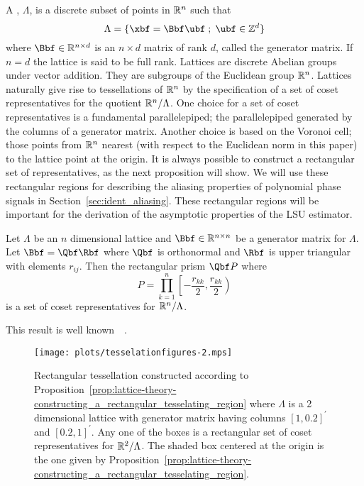 \documentclass[journal]{IEEEtran}
\begin{document}
A ,  $\Lambda$, is a discrete subset of points in ${\mathbb R}^n$ such that
\[
   \Lambda = \{\xbf = \Bbf\ubf \mid \ubf \in \ints^d \}
\]
where $\Bbf \in \reals^{n \times d}$ is an $n \times d$ matrix of rank $d$, called the generator matrix.  If $n = d$ the lattice is said to be full rank.  Lattices are discrete Abelian groups under vector addition.  They are subgroups of the Euclidean group ${\mathbb R}^n$.  Lattices naturally give rise to tessellations of ${\mathbb R}^n$ by the specification of a set of coset representatives for the quotient ${\mathbb R}^n / \Lambda$.  One choice for a set of coset representatives is a fundamental parallelepiped; the parallelepiped generated by the columns of a generator matrix.  Another choice is based on the Voronoi cell; those points from ${\mathbb R}^n$ nearest (with respect to the Euclidean norm in this paper) to the lattice point at the origin.  It is always possible to construct a rectangular set of representatives, as the next proposition will show.  We will use these rectangular regions for describing the aliasing properties of polynomial phase signals in Section~\ref{sec:ident_aliasing}.  These rectangular regions will be important for the derivation of the asymptotic properties of the LSU estimator.

\begin{proposition}\label{prop:lattice-theory-constructing_a_rectangular_tesselating_region}
Let  $\Lambda$ be an $n$ dimensional lattice and $\Bbf \in \reals^{n\times n}$ be a generator matrix for $\Lambda$. Let $\Bbf = \Qbf\Rbf$ where $\Qbf$ is orthonormal and $\Rbf$ is upper triangular with elements $r_{ij}$.  Then the rectangular prism $\Qbf P$ where
\[
P = \prod_{k=1}^{n}{\left[-\frac{r_{kk}}{2}, \frac{r_{kk}}{2}\right)}
\]
is a set of coset representatives for ${\mathbb R}^n / \Lambda$.
\end{proposition}
\begin{IEEEproof}
This result is well known~\cite[Chapter IX, Theorem IV]{Cassels_geom_numbers_1997}~\cite[Proposition 2.1]{McKilliam2010thesis}.  %
\end{IEEEproof}

\begin{figure}[tp]
	\centering
		\texttt{[image: plots/tesselationfigures-2.mps]}
		\caption{Rectangular tessellation constructed according to Proposition~\ref{prop:lattice-theory-constructing_a_rectangular_tesselating_region} where $\Lambda$ is a 2 dimensional lattice with generator matrix having columns $[1, 0.2]^\prime$ and $[0.2, 1]^\prime$. Any one of the boxes is a rectangular set of coset representatives for ${\mathbb R}^2 / \Lambda$.  The shaded box centered at the origin is the one given by Proposition~\ref{prop:lattice-theory-constructing_a_rectangular_tesselating_region}.}
		\label{lattices:fig:tessellation2}
\end{figure} 
\end{document}
